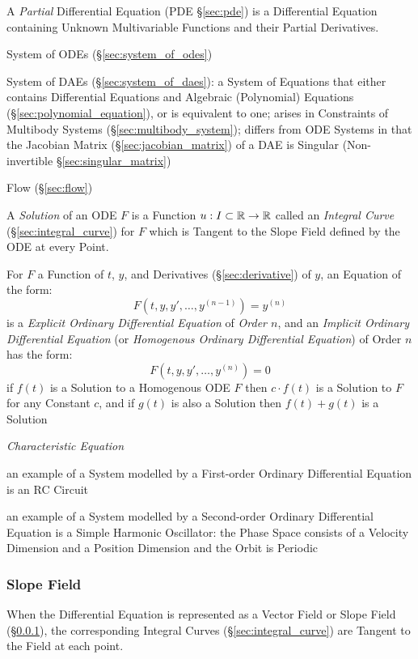 \fist A \emph{Partial} Differential Equation (PDE
\S\ref{sec:pde}) is a Differential Equation
containing Unknown Multivariable Functions and their Partial Derivatives.

\fist System of ODEs (\S\ref{sec:system_of_odes})

\fist System of DAEs (\S\ref{sec:system_of_daes}): a System of Equations that
either contains Differential Equations and Algebraic (Polynomial) Equations
(\S\ref{sec:polynomial_equation}), or is equivalent to one; arises in
Constraints of Multibody Systems (\S\ref{sec:multibody_system}); differs from
ODE Systems in that the Jacobian Matrix (\S\ref{sec:jacobian_matrix}) of a DAE
is Singular (Non-invertible \S\ref{sec:singular_matrix})

\fist Flow (\S\ref{sec:flow})

A \emph{Solution} of an ODE $F$ is a Function $u : I \subset \mathbb{R} \rightarrow
\mathbb{R}$ called an \emph{Integral Curve} (\S\ref{sec:integral_curve}) for $F$
which is Tangent to the Slope Field defined by the ODE at every Point.

For $F$ a Function of $t$, $y$, and Derivatives (\S\ref{sec:derivative}) of
$y$, an Equation of the form:
\[
  F(t,y,y',\ldots,y^{(n-1)}) = y^{(n)}
\]
is a \emph{Explicit Ordinary Differential Equation} of \emph{Order $n$}, and an
\emph{Implicit Ordinary Differential Equation} (or \emph{Homogenous Ordinary
  Differential Equation}) of Order $n$ has the form:
\[
  F(t,y,y',\ldots,y^{(n)}) = 0
\]
if $f(t)$ is a Solution to a Homogenous ODE $F$ then $c\cdot{f(t)}$ is a
Solution to $F$ for any Constant $c$, and if $g(t)$ is also a Solution then
$f(t) + g(t)$ is a Solution

\emph{Characteristic Equation}

an example of a System modelled by a First-order Ordinary Differential Equation
is an RC Circuit

an example of a System modelled by a Second-order Ordinary Differential
Equation is a Simple Harmonic Oscillator: the Phase Space consists of a
Velocity Dimension and a Position Dimension and the Orbit is Periodic



\subsubsection{Slope Field}\label{sec:slope_field}

When the Differential Equation is represented as a Vector Field or Slope Field
(\S\ref{sec:slope_field}), the corresponding Integral Curves
(\S\ref{sec:integral_curve}) are Tangent to the Field at each point.



